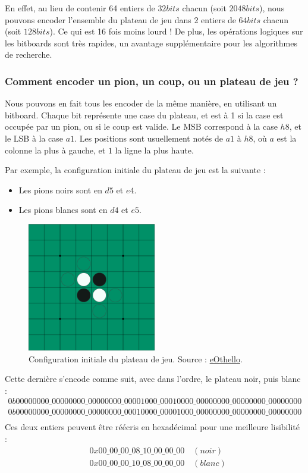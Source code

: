 En effet, au lieu de contenir 64 entiers de $32 bits$ chacun (soit $2048 bits$), nous pouvons encoder l'ensemble du plateau de jeu dans 2 entiers de $64 bits$ chacun (soit $128bits$). Ce qui est 16 fois moins lourd ! De plus, les opérations logiques sur les bitboards sont très rapides, un avantage supplémentaire pour les algorithmes de recherche.

\subsubsection{Comment encoder un pion, un coup, ou un plateau de jeu ?}
\label{subsubsec:enc}
Nous pouvons en fait tous les encoder de la même manière, en utilisant un bitboard. Chaque bit représente une case du plateau, et est à 1 si la case est occupée par un pion, ou si le coup est valide. Le \ac{MSB} correspond à la case $h8$, et le \ac{LSB} à la case $a1$. Les positions sont usuellement notés de $a1$ à $h8$, où $a$ est la colonne la plus à gauche, et $1$ la ligne la plus haute. \cite{brian_rose_2005} 

Par exemple, la configuration initiale du plateau de jeu est la suivante :
\begin{itemize}
    \item Les pions noirs sont en $d5$ et $e4$.
    \item Les pions blancs sont en $d4$ et $e5$.
\end{itemize}

\begin{figure}[H]
    \centering
    \includegraphics[width=0.5\textwidth]{ressources/plateau_init.png}
    \caption{Configuration initiale du plateau de jeu. Source : \href{https://www.eothello.com/}{eOthello}.}
    \label{fig:init_board}
\end{figure}

Cette dernière s'encode comme suit, avec dans l'ordre, le plateau noir, puis blanc : 
\begin{align*}
0b00000000\_00000000\_00000000\_00001000\_00010000\_00000000\_00000000\_00000000 \\
0b00000000\_00000000\_00000000\_00010000\_00001000\_00000000\_00000000\_00000000 \\
\end{align*}
Ces deux entiers peuvent être réécris en hexadécimal pour une meilleure lisibilité :
\begin{align*}
    &0x00\_00\_00\_08\_10\_00\_00\_00 \quad (noir)\\
    &0x00\_00\_00\_10\_08\_00\_00\_00 \quad (blanc)\\
\end{align*}

